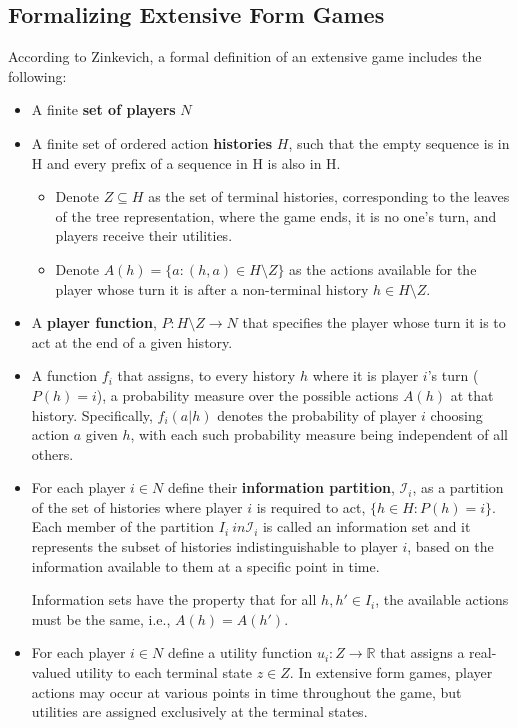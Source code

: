 \documentclass{article}
\begin{document}
\subsection{Formalizing Extensive Form Games}

According to Zinkevich, a formal definition of an extensive game includes the following:

\begin{itemize}
\item A finite \textbf{set of players} $N$
\item A finite set of ordered action \textbf{histories} $H$, such that the empty sequence is in H and every prefix of a sequence in H is also in H. 
\begin{itemize}
\item Denote $Z \subseteq H$ as the set of terminal histories, corresponding to the leaves of the tree representation, where the game ends, it is no one's turn, and players receive their utilities.
\item Denote $A(h) = \{ a : (h,a) \in H \setminus Z\}$ as the actions available for the player whose turn it is after a non-terminal history $h \in H \setminus Z$.
\end{itemize}

\item A \textbf{player function}, $P: H \setminus Z \rightarrow N$ that specifies the player whose turn it is to act at the end of a given history.

\item A function $f_i$ that assigns, to every history $h$ where it is player $i$'s turn ($P(h) = i$), a probability measure over the possible actions $A(h)$ at that history. Specifically, $f_i(a|h)$ denotes the probability of player $i$ choosing action $a$ given $h$, with each such probability measure being independent of all others.


\item For each player $i \in N$ define their \textbf{information partition}, $\mathcal{I}_i$, as a partition of the set of histories where player $i$ is required to act, $\{ h \in H : P(h) = i \}$. Each member of the partition $I_i \ in \mathcal{I}_i$ is called an information set and it 
represents the subset of histories indistinguishable to player $i$, based on the information available to them at a specific point in time.

Information sets have the property that for all $h, h' \in I_i$, the available actions must be the same, i.e., $A(h) = A(h')$. 
\item For each player $i \in N$ define a utility function $u_i: Z \rightarrow \mathbb{R}$ that assigns a real-valued utility to each terminal state $z \in Z$. In extensive form games, player actions may occur at various points in time throughout the game, but utilities are assigned exclusively at the terminal states.
\end{itemize}
\end{document}
